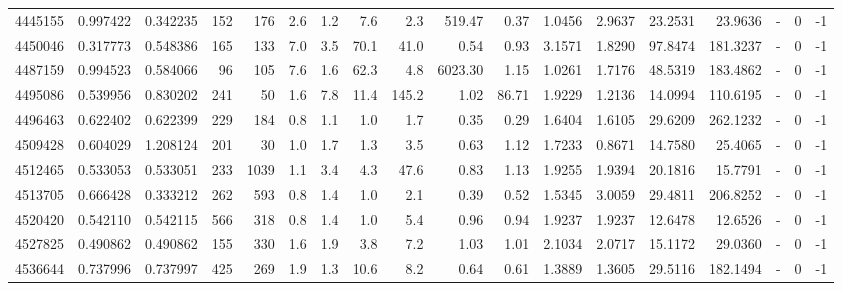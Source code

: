 \begin{tabular}{rrrrrrrrrrrrrrrlrr}
   4445155 & 0.997422 &   0.342235 &  152 &  176 &      2.6 &      1.2 &     7.6 &      2.3 &     519.47 &        0.37 &  1.0456 &  2.9637 &   23.2531 &   23.9636 &             - &        0 &         -1 \\
   4450046 & 0.317773 &   0.548386 &  165 &  133 &      7.0 &      3.5 &    70.1 &     41.0 &       0.54 &        0.93 &  3.1571 &  1.8290 &   97.8474 &  181.3237 &             - &        0 &         -1 \\
   4487159 & 0.994523 &   0.584066 &   96 &  105 &      7.6 &      1.6 &    62.3 &      4.8 &    6023.30 &        1.15 &  1.0261 &  1.7176 &   48.5319 &  183.4862 &             - &        0 &         -1 \\
   4495086 & 0.539956 &   0.830202 &  241 &   50 &      1.6 &      7.8 &    11.4 &    145.2 &       1.02 &       86.71 &  1.9229 &  1.2136 &   14.0994 &  110.6195 &             - &        0 &         -1 \\
   4496463 & 0.622402 &   0.622399 &  229 &  184 &      0.8 &      1.1 &     1.0 &      1.7 &       0.35 &        0.29 &  1.6404 &  1.6105 &   29.6209 &  262.1232 &             - &        0 &         -1 \\
   4509428 & 0.604029 &   1.208124 &  201 &   30 &      1.0 &      1.7 &     1.3 &      3.5 &       0.63 &        1.12 &  1.7233 &  0.8671 &   14.7580 &   25.4065 &             - &        0 &         -1 \\
   4512465 & 0.533053 &   0.533051 &  233 & 1039 &      1.1 &      3.4 &     4.3 &     47.6 &       0.83 &        1.13 &  1.9255 &  1.9394 &   20.1816 &   15.7791 &             - &        0 &         -1 \\
   4513705 & 0.666428 &   0.333212 &  262 &  593 &      0.8 &      1.4 &     1.0 &      2.1 &       0.39 &        0.52 &  1.5345 &  3.0059 &   29.4811 &  206.8252 &             - &        0 &         -1 \\
   4520420 & 0.542110 &   0.542115 &  566 &  318 &      0.8 &      1.4 &     1.0 &      5.4 &       0.96 &        0.94 &  1.9237 &  1.9237 &   12.6478 &   12.6526 &             - &        0 &         -1 \\
   4527825 & 0.490862 &   0.490862 &  155 &  330 &      1.6 &      1.9 &     3.8 &      7.2 &       1.03 &        1.01 &  2.1034 &  2.0717 &   15.1172 &   29.0360 &             - &        0 &         -1 \\
   4536644 & 0.737996 &   0.737997 &  425 &  269 &      1.9 &      1.3 &    10.6 &      8.2 &       0.64 &        0.61 &  1.3889 &  1.3605 &   29.5116 &  182.1494 &             - &        0 &         -1 \\

\end{tabular}
